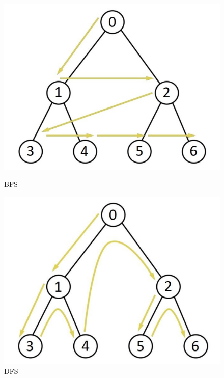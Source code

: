 \begin{figure}[H]
	\begin{minipage}{0.45\textwidth}
		\centering
		\includegraphics[width=\linewidth]{figures/bfs}
		\caption{BFS}
	\end{minipage}
	\hfill
	\begin{minipage}{0.45\textwidth}
		\centering
		\includegraphics[width=\linewidth]{figures/dfs}
		\caption{DFS}
	\end{minipage}
\end{figure}


	